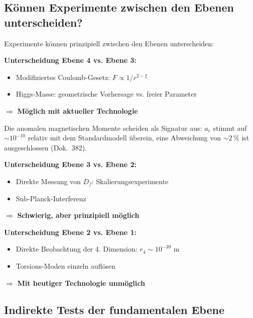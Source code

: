 	\subsection{Können Experimente zwischen den Ebenen unterscheiden?}
	
	\begin{important}
		Experimente können prinzipiell zwischen den Ebenen unterscheiden:
		
		\vspace{0.3cm}
		
		\textbf{Unterscheidung Ebene 4 vs. Ebene 3:}
		\begin{itemize}
			\item Modifiziertes Coulomb-Gesetz: $F \propto 1/r^{2-\xi}$
			\item Higgs-Masse: geometrische Vorhersage vs. freier Parameter
		\end{itemize}
		
		$\Rightarrow$ \textbf{Möglich mit aktueller Technologie}

		Die anomalen magnetischen Momente scheiden als Signatur aus: $a_e$ stimmt auf $\sim10^{-10}$ relativ mit dem Standardmodell überein, eine Abweichung von $\sim$2\,\% ist ausgeschlossen (Dok.~382).
		
		\vspace{0.3cm}
		
		\textbf{Unterscheidung Ebene 3 vs. Ebene 2:}
		\begin{itemize}
			\item Direkte Messung von $D_f$: Skalierungsexperimente
			\item Sub-Planck-Interferenz
		\end{itemize}
		
		$\Rightarrow$ \textbf{Schwierig, aber prinzipiell möglich}
		
		\vspace{0.3cm}
		
		\textbf{Unterscheidung Ebene 2 vs. Ebene 1:}
		\begin{itemize}
			\item Direkte Beobachtung der 4. Dimension: $r_4 \sim 10^{-39}$ m
			\item Torsions-Moden einzeln auflösen
		\end{itemize}
		
		$\Rightarrow$ \textbf{Mit heutiger Technologie unmöglich}
	\end{important}
	
	\subsection{Indirekte Tests der fundamentalen Ebene}
	
